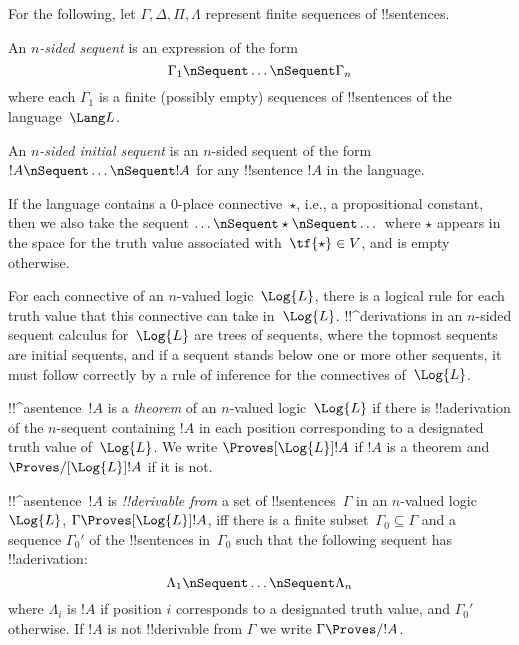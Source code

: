 \documentclass[../../../include/open-logic-section]{subfiles}
\begin{document}


For the following, let $\Gamma, \Delta, \Pi, \Lambda$ represent finite
sequences of !!{sentence}s.

\begin{defn}[Sequent]
An \emph{$n$-sided sequent} is an expression of the form
\[
\Gamma_1 \nSequent \dots \nSequent \Gamma_n
\]
where each $\Gamma_1$ is a finite (possibly empty) sequences of
!!{sentence}s of the language~$\Lang L$.
\end{defn}

\begin{defn}
An \emph{$n$-sided initial sequent} is an $n$-sided sequent of the
form $!A \nSequent \dots \nSequent !A$ for any !!{sentence} $!A$ in
the language.

If the language contains a $0$-place connective~$\star$, i.e., a
propositional constant, then we also take the sequent $\dots \nSequent
\star \nSequent \dots$ where $\star$ appears in the space for the truth
value associated with~$\tf{\star} \in V$, and is empty otherwise. 
\end{defn}

For each connective of an $n$-valued logic~$\Log{L}$, there is a
logical rule for each truth value that this connective can take
in~$\Log{L}$. !!^{derivation}s in an $n$-sided sequent calculus
for~$\Log{L}$ are trees of sequents, where the topmost sequents are
initial sequents, and if a sequent stands below one or more other
sequents, it must follow correctly by a rule of inference for the
connectives of~$\Log{L}$.

\begin{defn}[Theorems]
!!^a{sentence}~$!A$ is a \emph{theorem} of an $n$-valued
logic~$\Log{L}$ if there is !!a{derivation}
of the $n$-sequent containing $!A$ in each position corresponding to a
designated truth value of~$\Log{L}$.  We write $\Proves[\Log{L}]
!A$ if $!A$ is a theorem and $\Proves/[\Log{L}] !A$ if it is not.
\end{defn}

\begin{defn}[!!^{derivability}]
!!^a{sentence}~$!A$ is \emph{!!{derivable} from} a set of
!!{sentence}s~$\Gamma$ in an $n$-valued logic~$\Log{L}$, $\Gamma
\Proves[\Log{L}] !A$, iff there is a finite subset~$\Gamma_0 \subseteq
\Gamma$ and a sequence $\Gamma_0'$ of the !!{sentence}s in~$\Gamma_0$
such that the following sequent has  !!a{derivation}:
\[ \Lambda_1 \nSequent \dots \nSequent \Lambda_n \] where $\Lambda_i$
is $!A$ if position $i$ corresponds to a designated truth value, and
$\Gamma_0'$otherwise. If $!A$ is not !!{derivable} from $\Gamma$ we
write $\Gamma \Proves/ !A$.
\end{defn}
\end{document}

